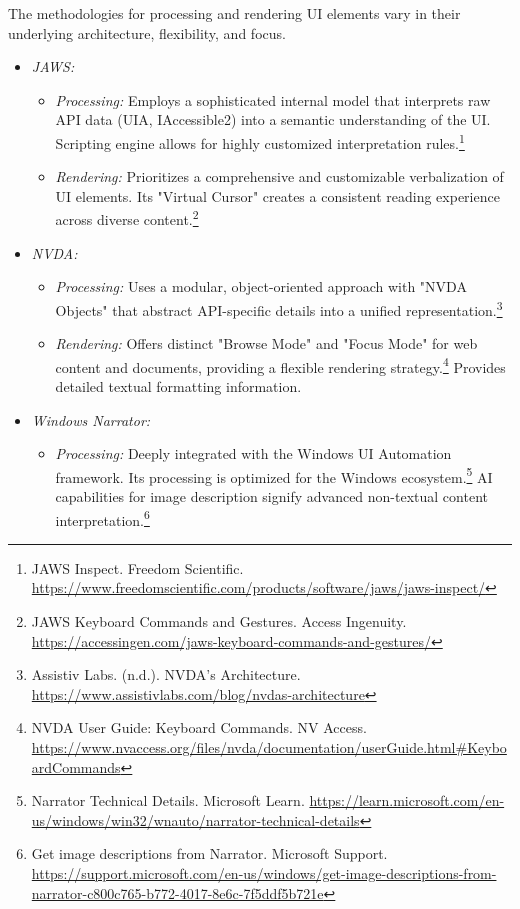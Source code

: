 The methodologies for processing and rendering UI elements vary in their underlying architecture, flexibility, and focus.

\begin{itemize}
    \item \emph{JAWS:}
    \begin{itemize}
        \item \emph{Processing:} Employs a sophisticated internal model that interprets raw API data (UIA, IAccessible2) into a semantic understanding of the UI. Scripting engine allows for highly customized interpretation rules.\footnote{JAWS Inspect. Freedom Scientific. \url{https://www.freedomscientific.com/products/software/jaws/jaws-inspect/}}
        \item \emph{Rendering:} Prioritizes a comprehensive and customizable verbalization of UI elements. Its "Virtual Cursor" creates a consistent reading experience across diverse content.\footnote{JAWS Keyboard Commands and Gestures. Access Ingenuity. \url{https://accessingen.com/jaws-keyboard-commands-and-gestures/}}
    \end{itemize}
    \item \emph{NVDA:}
    \begin{itemize}
        \item \emph{Processing:} Uses a modular, object-oriented approach with "NVDA Objects" that abstract API-specific details into a unified representation.\footnote{Assistiv Labs. (n.d.). NVDA's Architecture. \url{https://www.assistivlabs.com/blog/nvdas-architecture}}
        \item \emph{Rendering:} Offers distinct "Browse Mode" and "Focus Mode" for web content and documents, providing a flexible rendering strategy.\footnote{NVDA User Guide: Keyboard Commands. NV Access. \url{https://www.nvaccess.org/files/nvda/documentation/userGuide.html\#KeyboardCommands}} Provides detailed textual formatting information.
    \end{itemize}
    \item \emph{Windows Narrator:}
    \begin{itemize}
        \item \emph{Processing:} Deeply integrated with the Windows UI Automation framework. Its processing is optimized for the Windows ecosystem.\footnote{Narrator Technical Details. Microsoft Learn. \url{https://learn.microsoft.com/en-us/windows/win32/wnauto/narrator-technical-details}} AI capabilities for image description signify advanced non-textual content interpretation.\footnote{Get image descriptions from Narrator. Microsoft Support. \url{https://support.microsoft.com/en-us/windows/get-image-descriptions-from-narrator-c800c765-b772-4017-8e6c-7f5ddf5b721e}}

\end{itemize}
\end{itemize}
